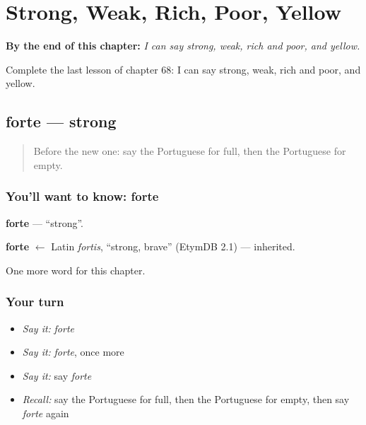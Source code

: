 
\chapter{Strong, Weak, Rich, Poor, Yellow}
\label{ch:pt-strong-weak-rich-poor-yellow}

\begin{chapteropening}
\textbf{By the end of this chapter:} \emph{I can say strong, weak, rich and poor, and yellow.}

Complete the last lesson of chapter 68: I can say strong, weak, rich and poor, and yellow.
\end{chapteropening}

\section[forte]{forte — strong}

\label{lesson:PT-C68-forte}



\begin{quote}
Before the new one: say the Portuguese for full, then the Portuguese for empty.
\end{quote}

\subsection*{You'll want to know: forte}
\textbf{forte} — \textquotedblleft{}strong\textquotedblright{}.

\begin{cousinweb}
\textbf{forte} $\leftarrow$ Latin \emph{fortis}, \textquotedblleft{}strong, brave\textquotedblright{} (EtymDB 2.1) — inherited.
\end{cousinweb}

\begin{grammarlens}[title={What you've built}]
One more word for this chapter.
\end{grammarlens}

\subsection*{Your turn}
\begin{itemize}
\raggedright
  \item \emph{Say it:} \emph{forte}
  \item \emph{Say it:} \emph{forte}, once more
  \item \emph{Say it:} say \emph{forte}
  \item \emph{Recall:} say the Portuguese for full, then the Portuguese for empty, then say \emph{forte} again
\end{itemize}

